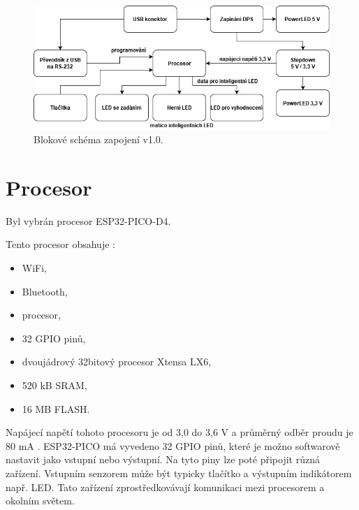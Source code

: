 \begin{figure}[!h]
  \begin{center}
    \includegraphics[scale=0.6]{obrazky/v1_blokove_schema.jpg}
  \end{center}
  \caption[Blokové schéma zapojení v1.0]{Blokové schéma zapojení v1.0.}
\end{figure}

\section{Procesor}
Byl vybrán procesor ESP32-PICO-D4.

Tento procesor obsahuje \cite{PICO_datasheet}: %
\begin{itemize}
    \item WiFi,
    \item Bluetooth,
    \item procesor,
    \item 32 GPIO pinů,
    \item dvoujádrový 32bitový procesor Xtensa LX6,
    \item 520 kB SRAM, %
    \item 16 MB FLASH. %
  \end{itemize}

  Napájecí napětí tohoto procesoru je od 3,0 do 3,6 V a průměrný odběr proudu je 80 mA \cite{PICO_datasheet}. ESP32-PICO má vyvedeno 32 GPIO pinů, které je 
  možno softwarově nastavit jako vstupní nebo výstupní. Na tyto piny lze poté připojit různá zařízení. Vstupním senzorem může 
  být typicky tlačítko a výstupním indikátorem např. LED. Tato zařízení zprostředkovávají komunikaci mezi procesorem a okolním 
  světem.


